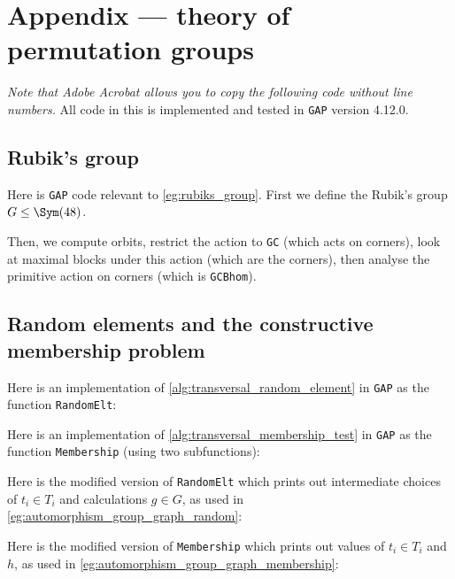 \chapter{Appendix --- theory of permutation groups}%

\textit{Note that Adobe Acrobat allows you to copy the following code without line numbers.} All code in this \thesis{} is implemented and tested in \texttt{GAP} version 4.12.0.

\section{Rubik's group}

Here is \texttt{GAP} code relevant to \autoref{eg:rubiks_group}. First we define the Rubik's group $G \leq \Sym(48)$.\label{app:rubiks_group}



Then, we compute orbits, restrict the action to \texttt{GC} (which acts on corners), look at maximal blocks under this action (which are the corners), then analyse the primitive action on corners (which is \texttt{GCBhom}).



\section{Random elements and the constructive membership problem}

Here is an implementation of \autoref{alg:transversal_random_element} in \texttt{GAP} as the function \texttt{RandomElt}:\label{app:transversal_random_element}



Here is an implementation of \autoref{alg:transversal_membership_test} in \texttt{GAP} as the function \texttt{Membership} (using two subfunctions):\label{app:transversal_membership_test}



Here is the modified version of \texttt{RandomElt} which prints out intermediate choices of $t_i \in T_i$ and calculations $g \in G$, as used in \autoref{eg:automorphism_group_graph_random}:



Here is the modified version of \texttt{Membership} which prints out values of $t_i \in T_i$ and $h$, as used in \autoref{eg:automorphism_group_graph_membership}:

